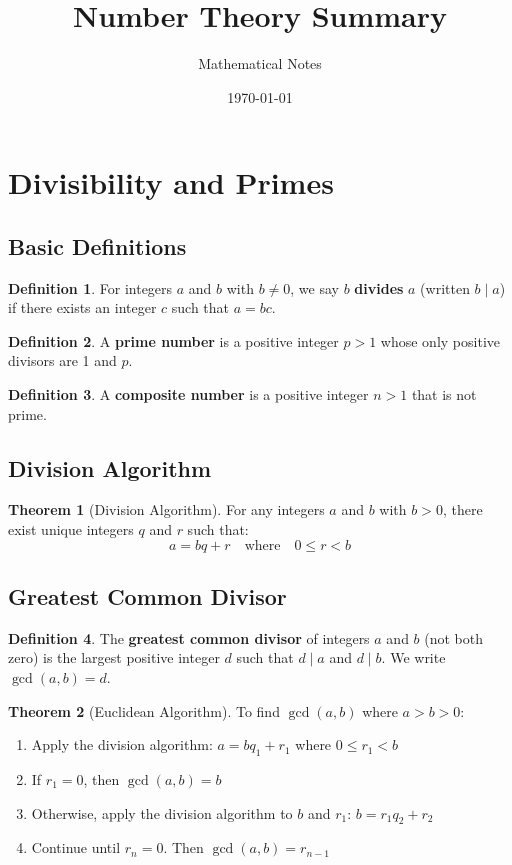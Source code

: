 \documentclass[11pt]{article}
\title{Number Theory Summary}
\author{Mathematical Notes}
\date{\today}
\theoremstyle{definition}
\newtheorem{definition}{Definition}[section]
\newtheorem{theorem}{Theorem}[section]
\begin{document}
\maketitle

\tableofcontents
\newpage

\section{Divisibility and Primes}

\subsection{Basic Definitions}
\begin{definition}
For integers $a$ and $b$ with $b \neq 0$, we say $b$ \textbf{divides} $a$ (written $b \mid a$) if there exists an integer $c$ such that $a = bc$.
\end{definition}

\begin{definition}
A \textbf{prime number} is a positive integer $p > 1$ whose only positive divisors are 1 and $p$.
\end{definition}

\begin{definition}
A \textbf{composite number} is a positive integer $n > 1$ that is not prime.
\end{definition}

\subsection{Division Algorithm}
\begin{theorem}[Division Algorithm]
For any integers $a$ and $b$ with $b > 0$, there exist unique integers $q$ and $r$ such that:
$$a = bq + r \quad \text{where} \quad 0 \leq r < b$$
\end{theorem}

\subsection{Greatest Common Divisor}
\begin{definition}
The \textbf{greatest common divisor} of integers $a$ and $b$ (not both zero) is the largest positive integer $d$ such that $d \mid a$ and $d \mid b$. We write $\gcd(a,b) = d$.
\end{definition}

\begin{theorem}[Euclidean Algorithm]
To find $\gcd(a,b)$ where $a > b > 0$:
\begin{enumerate}
    \item Apply the division algorithm: $a = bq_1 + r_1$ where $0 \leq r_1 < b$
    \item If $r_1 = 0$, then $\gcd(a,b) = b$
    \item Otherwise, apply the division algorithm to $b$ and $r_1$: $b = r_1q_2 + r_2$
    \item Continue until $r_n = 0$. Then $\gcd(a,b) = r_{n-1}$
\end{enumerate}
\end{theorem}
\end{document}
